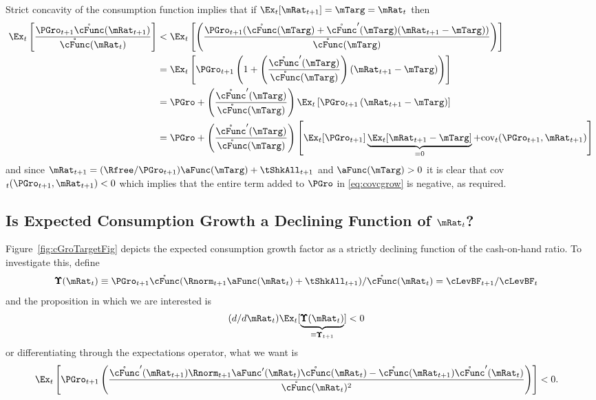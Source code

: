 \documentclass[BufferStockTheory]{subfiles}
\begin{document}
Strict concavity of the consumption function implies that if $\Ex_{t}[{\mRat}_{t+1}] = \mTarg = \mRat_{t}$ then
\begin{align}
  \Ex_{t}\left[\frac{{\PGro}_{t+1} \mathring{\cFunc}({\mRat}_{t+1})}{\mathring{\cFunc}(\mRat_{t})}
  \right]  & < \Ex_{t}\left[\left(\frac{{\PGro}_{t+1}
             (\mathring{\cFunc}(\mTarg)+\mathring{\cFunc}^{\prime}(\mTarg)({\mRat}_{t+1}-\mTarg))}{\mathring{\cFunc}(\mTarg)}\right)\right]  \nonumber \\
           & = \Ex_{t}\left[{\PGro}_{t+1} \left(1+\left(\frac{\mathring{\cFunc}^{\prime}(\mTarg)}{%
             \mathring{\cFunc}(\mTarg)}\right)({\mRat}_{t+1}-\mTarg)\right)\right]  \nonumber  \\
           & = \PGro + \left(\frac{\mathring{\cFunc}^{\prime}(\mTarg)}{\mathring{\cFunc}(\mTarg)}\right)\Ex_{t}\left[ {\PGro}_{t+1}\left({\mRat}_{t+1}-\mTarg\right)\right]  \nonumber \\
           & = \PGro + \left(\frac{\mathring{\cFunc}^{\prime}(\mTarg)}{\mathring{\cFunc}(\mTarg)}\right)\left[
             \Ex_{t}[ \PGro_{t+1}]\underbrace{\Ex_{t}[
             {\mRat}_{t+1}-\mTarg]}_{=0}+\mbox{cov}_{t}( {\PGro}_{t+1},{\mRat}_{t+1})\right]
             \label{eq:covcgrow}
\end{align}
and since $\mRat_{t+1} = (\Rfree/\PGro_{t+1}) \aFunc(\mTarg)+\tShkAll_{t+1}$ and
$\aFunc(\mTarg)>0$ it is clear that
cov$_{t}({\PGro}_{t+1},{\mRat}_{t+1})<0$ which implies that
the entire term added to $\PGro$ in \eqref{eq:covcgrow} is negative, as
required.

\hypertarget{dcgdxneg}{}
\subsection{Is Expected Consumption Growth a Declining Function of $\mRat_{t}$?}
\label{subsec:dcgdxneg}

Figure~\ref{fig:cGroTargetFig} depicts the expected consumption growth factor as a strictly
declining function of the cash-on-hand ratio. To investigate this,
define
\begin{align*}
  \pmb{\Upsilon}(\mRat_{t})  & \equiv  \PGro_{t+1} \mathring{\cFunc}(\Rnorm_{t+1}\aFunc(\mRat_{t})+\tShkAll_{t+1})/\mathring{\cFunc}(\mRat_{t})  = \cLevBF_{t+1}/\cLevBF_{t}
\end{align*}
and the proposition in which we are interested is
\begin{align*}
  (d/d\mRat_{t})\Ex_{t}[\underbrace{\pmb{\Upsilon}(\mRat_{t})}_{\equiv \pmb{\Upsilon}_{t+1}}]  & < 0  
\end{align*}
or differentiating through the expectations operator, what we want is
\begin{align}
  \Ex_{t}\left[\PGro_{t+1} \left(\frac{\mathring{\cFunc}^{\prime}(\mRat_{t+1})\Rnorm_{t+1}\aFunc^{\prime}(\mRat_{t})\mathring{\cFunc}(\mRat_{t})-\mathring{\cFunc}(\mRat_{t+1})\mathring{\cFunc}^{\prime}(\mRat_{t})}{\mathring{\cFunc}(\mRat_{t})^{2}}\right)\right]  & < 0 \label{eq:kappaPrimeLT0}.
\end{align}
\end{document}
